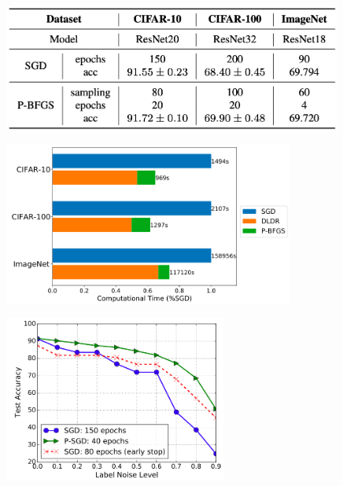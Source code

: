 \documentclass[t]{beamer}
\begin{document}
\begin{frame}
\begin{figure}
\includegraphics[width=0.99\textwidth]{exp-4}
\end{figure}
\end{frame}



\begin{frame}
\begin{figure}
\includegraphics[width=0.85\textwidth]{exp-5}
\end{figure}
\end{frame}



\begin{frame}
\begin{figure}
\includegraphics[width=0.65\textwidth]{exp-6}
\end{figure}
\end{frame}
\end{document}
